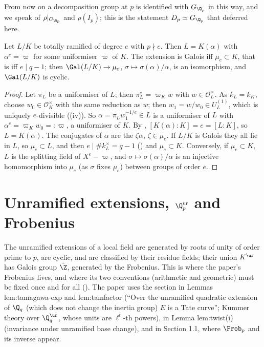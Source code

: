 From now on a decomposition group at $p$ is identified with $G_{\Q_p}$ in this way, and we speak of $\rho|_{G_{\Q_p}}$ and $\rho(I_p)$; this is the
statement $D_p\simeq G_{\Q_p}$ that  deferred here.

\begin{proposition}\label{prop:local:tame-totally-ramified}
Let $L/K$ be totally ramified of degree $e$ with $p\nmid e$. Then $L=K(\alpha)$ with $\alpha^e=\varpi$ for some uniformiser $\varpi$ of $K$. The extension
is Galois iff $\mu_e\subset K$, that is iff $e\mid q-1$; then $\Gal(L/K)\to\mu_e$, $\sigma\mapsto\sigma(\alpha)/\alpha$, is an isomorphism, and
$\Gal(L/K)$ is cyclic.
\end{proposition}

\begin{proof}
Let $\pi_L$ be a uniformiser of $L$; then $\pi_L^e=\varpi_Kw$ with $w\in\mathcal O_L^\times$. As $k_L=k_K$, choose $w_0\in\mathcal O_K^\times$ with the same
reduction as $w$; then $w_1=w/w_0\in U^{(1)}_L$, which is uniquely $e$-divisible ((iv)). So
$\alpha=\pi_Lw_1^{-1/e}\in L$ is a uniformiser of $L$ with $\alpha^e=\varpi_Kw_0=:\varpi$, a uniformiser of $K$. By ,
$[K(\alpha):K]=e=[L:K]$, so $L=K(\alpha)$. The conjugates of $\alpha$ are the $\zeta\alpha$, $\zeta\in\mu_e$. If $L/K$ is Galois they all lie in $L$, so
$\mu_e\subset L$, and then $e\mid\#k_L^\times=q-1$ () and $\mu_e\subset K$. Conversely, if $\mu_e\subset K$, $L$ is the splitting
field of $X^e-\varpi$, and $\sigma\mapsto\sigma(\alpha)/\alpha$ is an injective homomorphism into $\mu_e$ (as $\sigma$ fixes $\mu_e$) between groups of order $e$.
\end{proof}

\section{Unramified extensions, \texorpdfstring{$\Q_p^{\mathrm{ur}}$}{Qp-ur} and Frobenius}\label{sec:local:unram}

The unramified extensions of a local field are generated by roots of unity of order prime to $p$, are cyclic, and are classified by
their residue fields; their union $K^{\ur}$ has Galois group $\hat\Z$, generated by the Frobenius. This is where the paper's Frobenius lives,
and where its two conventions (arithmetic and geometric) must be fixed once and for all (). The paper uses the
section in Lemmas lem:tamagawa-exp and lem:tamfactor (``Over the unramified quadratic extension of $\Q_q$ (which does not change the inertia
group) $E$ is a Tate curve''; Kummer theory over $\Q_q^{\ur}$, whose units are $\ell^t$-th powers), in Lemma lem:twist(i) (invariance under unramified base change),
and in Section 1.1, where $\Frob_p$ and its inverse appear.

